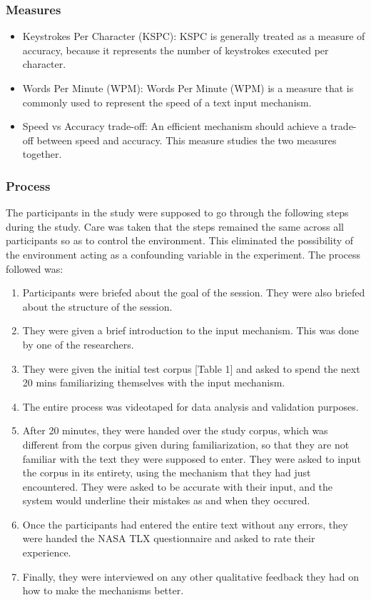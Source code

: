 \subsubsection{Measures}
\begin{itemize}
	\item Keystrokes Per Character (KSPC): KSPC is generally treated as a measure of accuracy, because it
represents the number of keystrokes executed per character.
	\item Words Per Minute (WPM): Words Per Minute (WPM) is a measure that is commonly used to represent
the speed of a text input mechanism.
	\item Speed vs Accuracy trade-off: An efficient mechanism should achieve a trade-off between speed and accuracy. This measure studies the two measures together.
\end{itemize}
\subsubsection{Process}

The participants in the study were supposed to go through the following steps during the study. Care was taken that the steps remained the same across all participants so as to control the environment. This eliminated the possibility of the environment acting as a confounding variable in the experiment. The process followed was:

\begin{enumerate}
\item Participants were briefed about the goal of the session. They were also briefed about the structure of the session.
\item They were given a brief introduction to the input mechanism. This was done by one of the researchers.
\item They were given the initial test corpus [Table 1] and asked to spend the next 20 mins familiarizing themselves with the input mechanism.
\item The entire process was videotaped for data analysis and validation purposes.
\item After 20 minutes, they were handed over the study corpus, which was different from the corpus given during familiarization, so that they are not familiar with the text they were supposed to enter. They were asked to input the corpus in its entirety, using the mechanism that they had just encountered. They were asked to be accurate with their input, and the system would underline their mistakes as and when they occured.
\item Once the participants had entered the entire text without any errors, they were handed the NASA TLX questionnaire and asked to rate their experience. 
\item Finally, they were interviewed on any other qualitative feedback they had on how to make the mechanisms better.
\end{enumerate}
	